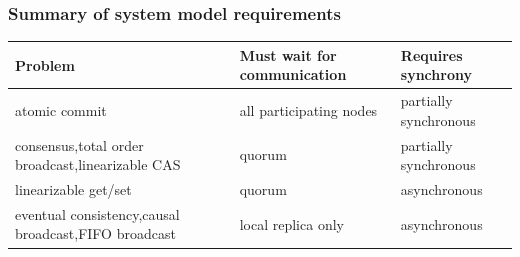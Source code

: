 \begin{frame}
    \label{s:model-requirements}
    \frametitle{Summary of system model requirements}
    \renewcommand{\arraystretch}{1.5}%
    \begin{tabular}{>{\raggedright}p{3.7cm}|>{\raggedright}p{3cm}|>{\raggedright\arraybackslash}p{2.4cm}} %
        \textbf{Problem} & \textbf{Must wait for communication} & \textbf{Requires synchrony} \\\hline
        atomic commit & all participating nodes & partially synchronous\pause\\
        consensus,\newline total order broadcast,\newline linearizable CAS & quorum & partially synchronous\pause\\
        linearizable get/set & quorum & asynchronous\pause\\
        eventual consistency,\newline causal broadcast,\newline FIFO broadcast & local replica only & asynchronous \\\hline
    \end{tabular}
\end{frame}
\label{l:model-requirements}

